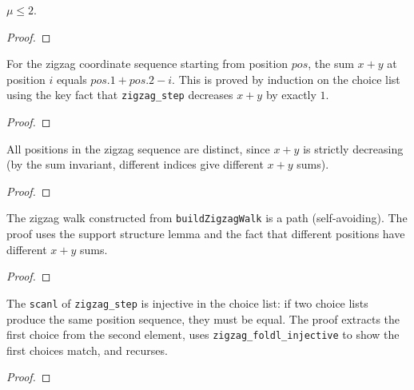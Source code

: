 \begin{theorem}\label{thm:cc_le_two}
\leanok
{}
  $\mu \leq 2$.
\end{theorem}
\begin{proof}
\leanok
\end{proof}

\begin{lemma}\label{lem:zigzag_sum}
\leanok
  For the zigzag coordinate sequence starting from position $\mathit{pos}$,
  the sum $x + y$ at position $i$ equals $\mathit{pos}.1 + \mathit{pos}.2 - i$.
  This is proved by induction on the choice list using the key fact that
  \texttt{zigzag\_step} decreases $x+y$ by exactly $1$.
\end{lemma}
\begin{proof}
\leanok
\end{proof}

\begin{lemma}\label{lem:zigzag_nodup}
\leanok
{}
  All positions in the zigzag sequence are distinct, since $x+y$ is
  strictly decreasing (by the sum invariant, different indices give
  different $x+y$ sums).
\end{lemma}
\begin{proof}
\leanok
{}
\end{proof}

\begin{lemma}\label{lem:zigzag_isPath}
\leanok
{}
  The zigzag walk constructed from \texttt{buildZigzagWalk} is a path
  (self-avoiding). The proof uses the support structure lemma and
  the fact that different positions have different $x+y$ sums.
\end{lemma}
\begin{proof}
\leanok
\end{proof}

\begin{lemma}\label{lem:zigzag_scanl_inj}
\leanok
  The \texttt{scanl} of \texttt{zigzag\_step} is injective in the
  choice list: if two choice lists produce the same position sequence,
  they must be equal. The proof extracts the first choice from the
  second element, uses \texttt{zigzag\_foldl\_injective} to show the
  first choices match, and recurses.
\end{lemma}
\begin{proof}
\leanok
\end{proof}

